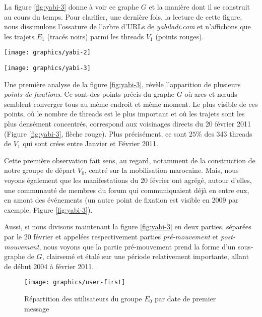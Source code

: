 \documentclass[symmetric,justified,marginals=raggedouter]{tufte-book}
\begin{document}
La figure \ref{fig:yabi-3} donne à voir ce graphe $G$ et la manière dont il se construit au cours du temps. Pour clarifier, une dernière fois, la lecture de cette figure, nous dissimulons l'ossature de l'arbre d'URLs de \textit{yabiladi.com} et n'affichons que les trajets $E_1$ (tracés noirs) parmi les threads $V_1$ (points rouges).

\begin{figure*}[hbtp]%
  \texttt{[image: graphics/yabi-2]}
  \caption{Exemple de trajet individuel (tracé bleu clair) parmi 66 threads du forum \textit{yabiladi.com}}
  \label{fig:yabi-2}
\end{figure*}

\begin{figure*}[hbtp]%
  \texttt{[image: graphics/yabi-3]}
  \caption{Trajets agrégés $E_1$ de l'ensemble des contributeurs des threads $V_1$ du forum \textit{yabiladi.com}}
  \label{fig:yabi-3}
\end{figure*}

\noindent Une première analyse de la figure \ref{fig:yabi-3}, révèle l'apparition de plusieurs \textit{points de fixations}. Ce sont des points précis du graphe $G$ où arcs et nœuds semblent converger tous au même endroit et même moment. Le plus visible de ces points, où le nombre de threads est le plus important et où les trajets sont les plus densément  concentrés, correspond aux voisinages directs du 20 février 2011 (Figure \ref{fig:yabi-3}, flèche rouge). Plus précisément,  ce sont $25\%$ des 343 threads de $V_1$ qui sont crées entre Janvier et Février 2011.

Cette première observation fait sens, au regard, notamment de la construction de notre groupe de départ $V_0$, centré sur la mobilisation marocaine. Mais, nous voyons également que les manifestations du 20 février ont agrégé, autour d'elles, une communauté de membres du forum qui communiquaient déjà en entre eux, en amont des événements (un autre point de fixation est visible en 2009 par exemple, Figure \ref{fig:yabi-3}).

Aussi, si nous divisons maintenant la figure \ref{fig:yabi-3} en deux parties, séparées par le 20 février et appelées respectivement parties \textit{pré-mouvement} et \textit{post-mouvement}, nous voyons que la partie pré-mouvement prend la forme d'un sous-graphe de $G$, clairsemé et étalé sur une période relativement importante, allant de début 2004 à février 2011.

\begin{figure}
  \texttt{[image: graphics/user-first]}
  \caption{Répartition des utilisateurs du groupe $E_0$ par date de premier message}
  \label{fig:user-first}
\end{figure}  
\end{document}
